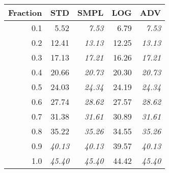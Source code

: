 \documentclass{standalone}
\begin{document}
\begin{tabular}{r|rrrr}
      \toprule
      Fraction & STD & SMPL & LOG & ADV\\
      \midrule
      0.1 & 5.52 & \emph{7.53} & 6.79 & \emph{7.53}\\
  0.2 & 12.41 & \emph{13.13} & 12.25 & \emph{13.13}\\
  0.3 & 17.13 & \emph{17.21} & 16.26 & \emph{17.21}\\
  0.4 & 20.66 & \emph{20.73} & 20.30 & \emph{20.73}\\
  0.5 & 24.03 & \emph{24.34} & 24.19 & \emph{24.34}\\
  0.6 & 27.74 & \emph{28.62} & 27.57 & \emph{28.62}\\
  0.7 & 31.38 & \emph{31.61} & 30.89 & \emph{31.61}\\
  0.8 & 35.22 & \emph{35.26} & 34.55 & \emph{35.26}\\
  0.9 & \emph{40.13} & \emph{40.13} & 39.57 & \emph{40.13}\\
  1.0 & \emph{45.40} & \emph{45.40} & 44.42 & \emph{45.40}\\
  \bottomrule
\end{tabular}
\end{document}
